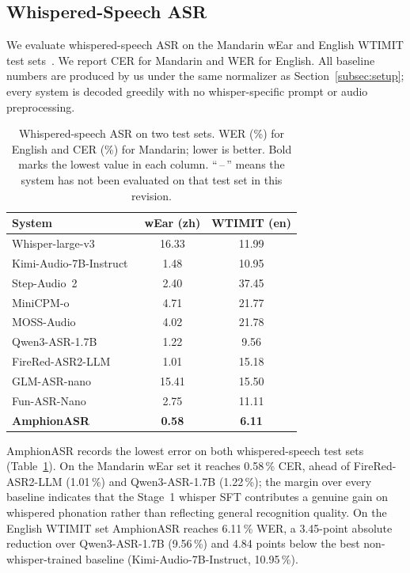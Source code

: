\subsection{Whispered-Speech ASR}
\label{sec:whisper-asr}

We evaluate whispered-speech ASR on the Mandarin wEar and English
WTIMIT test sets~\cite{fang2025whisperear}.
We report CER for Mandarin and WER for English.
All baseline numbers are produced by us under the same normalizer as
Section~\ref{subsec:setup}; every system is decoded greedily with no
whisper-specific prompt or audio preprocessing.

\begin{table}[t]
  \caption{Whispered-speech ASR on two test sets. WER (\%) for English
    and CER (\%) for Mandarin; lower is better. Bold marks the lowest
    value in each column. ``\,--\,'' means the system has not been
    evaluated on that test set in this revision.}
  \label{tab:whisper_asr}
  \centering
  \small
  \begin{tabular}{lcc}
    \toprule
    System & wEar (zh) & WTIMIT (en) \\
    \midrule
    Whisper-large-v3~\cite{radford2023whisper}        & 16.33 & 11.99 \\
    Kimi-Audio-7B-Instruct~\cite{kimiaudio2025}     & 1.48  & 10.95 \\
    Step-Audio~2~\cite{stepaudio22025}               & 2.40  & 37.45 \\
    MiniCPM-o~\cite{minicpm2025}                     & 4.71  & 21.77 \\
    MOSS-Audio~\cite{moss2026audio}                 & 4.02  & 21.78 \\
    Qwen3-ASR-1.7B~\cite{qwen2025qwen3asr}           & 1.22  & 9.56  \\
    FireRed-ASR2-LLM~\cite{fireredasr2025}           & 1.01  & 15.18 \\
    GLM-ASR-nano~\cite{glmasr2025}                   & 15.41 & 15.50 \\
    Fun-ASR-Nano~\cite{funasrnano}                   & 2.75  & 11.11 \\
    \midrule
    \textbf{AmphionASR}                              & \textbf{0.58}  & \textbf{6.11}  \\
    \bottomrule
  \end{tabular}
\end{table}

AmphionASR records the lowest error on both whispered-speech test sets
(Table~\ref{tab:whisper_asr}). On the Mandarin wEar set it reaches
0.58\,\% CER, ahead of FireRed-ASR2-LLM (1.01\,\%) and
Qwen3-ASR-1.7B (1.22\,\%); the margin over every baseline indicates
that the Stage~1 whisper SFT contributes a genuine gain on whispered
phonation rather than reflecting general recognition quality.
On the English WTIMIT
set AmphionASR reaches 6.11\,\% WER, a 3.45-point absolute reduction
over Qwen3-ASR-1.7B (9.56\,\%) and 4.84 points below the best
non-whisper-trained baseline (Kimi-Audio-7B-Instruct, 10.95\,\%).

